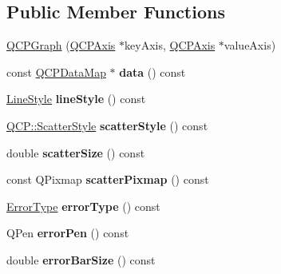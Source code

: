 \subsection*{Public Member Functions}
\begin{DoxyCompactItemize}
\item 
\hyperlink{classQCPGraph_a0393a38cf7183cbf46348eb6cf9a5a6c}{Q\-C\-P\-Graph} (\hyperlink{classQCPAxis}{Q\-C\-P\-Axis} $\ast$key\-Axis, \hyperlink{classQCPAxis}{Q\-C\-P\-Axis} $\ast$value\-Axis)
\item 
\hypertarget{classQCPGraph_a8f4c17d993df4759c7426db45b33fbc0}{const \hyperlink{qcustomplot_8h_a84a9c4a4c2216ccfdcb5f3067cda76e3}{Q\-C\-P\-Data\-Map} $\ast$ {\bfseries data} () const }\label{classQCPGraph_a8f4c17d993df4759c7426db45b33fbc0}

\item 
\hypertarget{classQCPGraph_ad6db8d31abeac256a285fc68d6b9b9be}{\hyperlink{classQCPGraph_ad60175cd9b5cac937c5ee685c32c0859}{Line\-Style} {\bfseries line\-Style} () const }\label{classQCPGraph_ad6db8d31abeac256a285fc68d6b9b9be}

\item 
\hypertarget{classQCPGraph_a3997fdcb68f8543395d964e09562f861}{\hyperlink{namespaceQCP_af66d0711d42fe78d96c28abadc67f26f}{Q\-C\-P\-::\-Scatter\-Style} {\bfseries scatter\-Style} () const }\label{classQCPGraph_a3997fdcb68f8543395d964e09562f861}

\item 
\hypertarget{classQCPGraph_a3d8e1e8affba4d443925b2e3e0d633c4}{double {\bfseries scatter\-Size} () const }\label{classQCPGraph_a3d8e1e8affba4d443925b2e3e0d633c4}

\item 
\hypertarget{classQCPGraph_a1fb25d67dc6f85004d913ceb945beae3}{const Q\-Pixmap {\bfseries scatter\-Pixmap} () const }\label{classQCPGraph_a1fb25d67dc6f85004d913ceb945beae3}

\item 
\hypertarget{classQCPGraph_a250bcdf78abac87bc6d46ee6fd99a92d}{\hyperlink{classQCPGraph_ad23b514404bd2cb3216f57c90904d6af}{Error\-Type} {\bfseries error\-Type} () const }\label{classQCPGraph_a250bcdf78abac87bc6d46ee6fd99a92d}

\item 
\hypertarget{classQCPGraph_a83455e01093bb899f3b59d4a6fdcd57b}{Q\-Pen {\bfseries error\-Pen} () const }\label{classQCPGraph_a83455e01093bb899f3b59d4a6fdcd57b}

\item 
\hypertarget{classQCPGraph_ae31efdcbc6ba3d73a7aeb83c774f958a}{double {\bfseries error\-Bar\-Size} () const }\label{classQCPGraph_ae31efdcbc6ba3d73a7aeb83c774f958a}


\end{DoxyCompactItemize}

